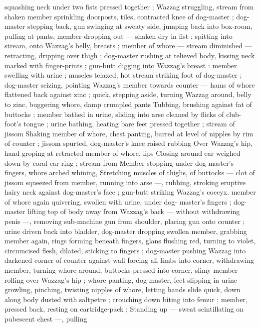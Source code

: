 squashing neck under two fists pressed together ; Wazzag 
struggling, stream from shaken member sprinkling doorposts, tiles, 
contracted knee of dog-master ; dog-master stepping back, gun 
swinging at sweaty side, jumping back into box-room, pulling at 
pants, member dropping out --- shaken dry in fist ; spitting into 
stream, onto Wazzag's belly, breasts ; member of whore --- stream 
diminished --- retracting, dripping over thigh ; dog-master rushing at 
telieved body, kissing neck marked with finger-prints ; gun-butt 
digging into Wazzag's breast : member swelling with urine ; muscles 
telaxed, hot stream striking foot of dog-master ; dog-master seizing, 
pointing Wazzag's member towards counter --- hams of whore 
flattened back against zinc ; quick, stepping aside, turning Wazzag 
around, belly to zinc, buggering whore, damp crumpled pants 
Tubbing, brushing against fat of buttocks ; member bathed in urine, 
sliding into arse cleaned by flicks of club-foot's tongue ; urine 
bathing, heating bare feet pressed together ; stream of jissom 
Shaking member of whore, chest panting, barred at level of nipples 
by rim of counter ; jissom spurted, dog-master's knee raised rubbing 
Over Wazzag's hip, hand groping at retracted member of whore, lips 
Closing around ear weighed down by coral ear-ring ; stream from 
Member stopping under dog-master's fingers, whore arched whining, 
Stretching muscles of thighs, of buttocks --- clot of jissom squeezed 
from member, running into arse ---, rubbing, stroking eruptive hairy 
neck against dog-master's face ; gun-butt striking Wazzag's coccyx. 
member of whore again quivering, swollen with urine, under dog- 
master's fingers ; dog-master lifting top of body away from Wazzag's 
back --- without withdrawing penis ---, removing sub-machine gun 
from shoulder, placing gun onto counter ; urine driven back into 
bladder, dog-master dropping swollen member, grabbing member 
again, rings forming beneath fingers, glans flushing red, turning to 
violet, circumcised flesh, dilated, sticking to fingers ; dog-master 
pushing Wazzag into darkened corner of counter against wall 
forcing all limbs into corner, withdrawing member, turning whore 
around, buttocks pressed into corner, slimy member rolling over 
Wazzag's hip ; whore panting, dog-master, feet slipping in urine 
growling, pinching, twisting nipples of whore, letting hands slide 
quick, down along body dusted with saltpetre ; crouching down 
biting into femur ; member, pressed back, resting on cartridge-pack 
; Standing up --- sweat scintillating on pubescent chest ---, pulling 
